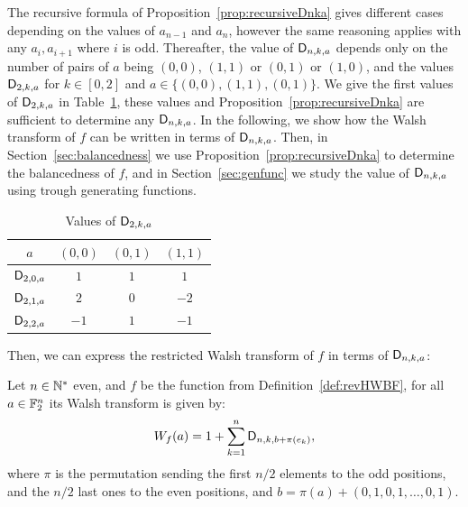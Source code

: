 \documentclass[11pt]{llncs}
\begin{document}

The recursive formula of Proposition~\ref{prop:recursiveDnka} gives different cases depending on the values of $a_{n-1}$ and $a_n$, however the same reasoning applies with any $a_i, a_{i+1}$ where $i$ is odd. 
Thereafter, the value of $\mathsf{D}_{n,k,a}$ depends only on the number of pairs of $a$ being $(0,0)$, $(1,1)$ or $(0,1)$ or $(1,0)$, and the values $\mathsf{D}_{2,k,a}$ for $k \in [0,2]$ and $a \in \{ (0,0),(1,1),(0,1)\}$. 
We give the first values of $\mathsf{D}_{2,k,a}$ in Table~\ref{tab:Dnka},  these values and Proposition~\ref{prop:recursiveDnka} are sufficient to determine any $\mathsf{D}_{n,k,a}$. 
In the following, we show how the Walsh transform of $f$ can be written in terms of $\mathsf{D}_{n,k,a}$. Then, in Section~\ref{sec:balancedness} we use Proposition~\ref{prop:recursiveDnka} to determine the balancedness of $f$, and in Section~\ref{sec:genfunc} we study the value of $\mathsf{D}_{n,k,a}$ using trough generating functions.





\begin{table}[H]
	\centering
	\begin{tabular}{|c|c|c|c|}
		\hline
		$a$ & $(0,0)$ & $(0,1)$ & $(1,1)$ \\ \hline
		$\mathsf{D}_{2,0,a}$ &$1$&$1$ & $1$\\ \hline
		$\mathsf{D}_{2,1,a}$ &$2$& $0$ & $-2$\\ \hline
		$\mathsf{D}_{2,2,a}$ &$-1$&$1$ & $-1$\\ \hline
	\end{tabular}
	\caption{Values of $\mathsf{D}_{2,k,a}$}\label{tab:Dnka}
\end{table}



Then, we can express the restricted Walsh transform of $f$ in terms of $\mathsf{D}_{n,k,a}$:


\begin{proposition}\label{prop:WT}
	Let $n \in \mathbb{N}^*$ even, and $f$ be the function from Definition~\ref{def:revHWBF}, for all $a\in \mathbb{F}_2^n$ its Walsh transform is given by:
	\[ W_{f}(a)=1+\sum_{k=1}^n \mathsf{D}_{n,k,b+\pi(e_k)},\]
where $\pi$ is the permutation sending the first $n/2$ elements to the odd positions, and the $n/2$ last ones to the even positions, and $b=\pi(a)+(0,1,0,1,\ldots,0,1)$.
\end{proposition}
\end{document}
